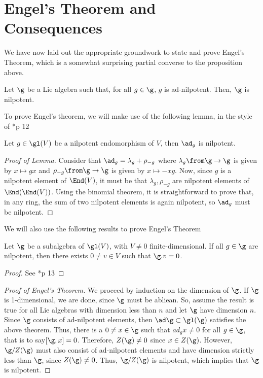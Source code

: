 \documentclass[11pt,leqno,oneside]{amsart}
\numberwithin{thm}{section}
\begin{document}
\section{Engel's Theorem and Consequences}
We have now laid out the appropriate groundwork to state and prove
Engel's Theorem, which is a somewhat surprising partial converse to
the proposition above.
\begin{thm}
  Let \(\g\) be a Lie algebra such that, for all \(g \in \g\), \(g\)
  is ad-nilpotent. Then, \(\g\) is nilpotent.
\end{thm}
To prove Engel's theorem, we will make use of the following lemma, in
the style of \cite{humph}*{p 12}
\begin{lem}\label{nilp-implies-ad-nilp}
  Let \(g \in \gl(V)\) be a nilpotent endomorphism of \(V\), then
  \(\ad_g\) is nilpotent.
\end{lem}
\begin{proof}[Proof of Lemma]
  Consider that \(\ad_g = \lambda_g + \rho_{-g}\) where \(\lambda_g \from
  \g \to \g\) is given by \(x \mapsto gx\) and \(\rho_{-g} \from \g
  \to \g\) is given by \(x \mapsto -xg\). Now, since \(g\) is a
  nilpotent element of \(\End(V)\), it must be that \(\lambda_g,
  \rho_{-g}\) are nilpotent elements of \(\End(\End(V))\). Using the
  binomial theorem, it is straightforward to prove that, in any ring,
  the sum of 
  two nilpotent elements is again nilpotent, so \(\ad_g\) must be nilpotent.
\end{proof}
We will also use the following results to prove Engel's Theorem
\begin{thm}\label{nilp-has-nontrivial-simult-0-eigenspace}
  Let \(\g\) be a subalgebra of \(\gl(V)\), with \(V \neq 0\)
  finite-dimensional. If all \(g \in \g\) are nilpotent, then there
  exists \(0 \neq v \in V\) such that \(\g.v = 0\). 
\end{thm}
\begin{proof}
  See \cite{humph}*{p 13}
\end{proof}
\begin{proof}[Proof of Engel's Theorem]
  We proceed by induction on the dimension of \(\g\). If \(\g\) is
  1-dimensional, we are done, since \(\g\) must be abliean. So, assume
  the result is true for all Lie algebras with dimension less than
  \(n\) and let \(\g\) have dimension \(n\). Since \(\g\) consists of
  ad-nilpotent elements, then \(\ad \g \subset 
  \gl(\g)\) satisfies the above theorem. Thus, there is a \(0 \neq x \in
  \g\) such that \(ad_g x \neq 0\) for all \(g \in \g\), that is to
  say\([\g, x] = 0\). Therefore, \(Z(\g) \neq 0\) since \(x \in
  Z(\g)\). However, \(\g / Z(\g)\) must also consist of ad-nilpotent
  elements and have dimension strictly less than \(\g\), since \(Z(\g)
  \neq 0\). Thus, \(\g / Z(\g)\) is nilpotent, which implies that
  \(\g\) is nilpotent. 
\end{proof}
\end{document}
